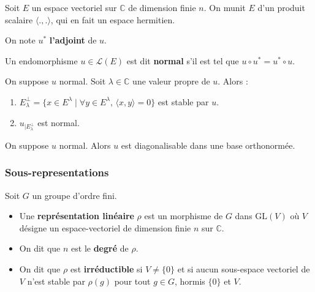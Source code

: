 	Soit $E$ un espace vectoriel sur $\mathbb{C}$ de dimension finie $n$. On munit $E$ d'un produit scalaire $\langle . , . \rangle$, qui en fait un espace hermitien.


	\begin{notation}
		On note $u^*$ \textbf{l'adjoint} de $u$.
	\end{notation}

	\begin{definition}
		Un endomorphisme $u \in \mathcal{L}(E)$ est dit \textbf{normal} s'il est tel que $u \circ u^* = u^* \circ u$.
	\end{definition}

	\begin{proposition}
		On suppose $u$ normal. Soit $\lambda \in \mathbb{C}$ une valeur propre de $u$. Alors :
		\begin{enumerate}[label=(\roman*)]
			\item $E_\lambda^\perp = \{ x \in E^\lambda \mid \forall y \in E^\lambda, \, \langle x, y \rangle = 0 \}$ est stable par $u$.
			\item $u_{| E_\lambda^\perp}$ est normal.
		\end{enumerate}
	\end{proposition}

	\begin{corollary}
		On suppose $u$ normal. Alors $u$ est diagonalisable dans une base orthonormée.
	\end{corollary}

	\subsubsection{Sous-representations}


	Soit $G$ un groupe d'ordre fini.

	\begin{definition}
		\begin{itemize}
			\item Une \textbf{représentation linéaire} $\rho$ est un morphisme de $G$ dans $\mathrm{GL}(V)$ où $V$ désigne un espace-vectoriel de dimension finie $n$ sur $\mathbb{C}$.
			\item On dit que $n$ est le \textbf{degré} de $\rho$.
			\item On dit que $\rho$ est \textbf{irréductible} si $V \neq \{ 0 \}$ et si aucun sous-espace vectoriel de $V$ n'est stable par $\rho(g)$ pour tout $g \in G$, hormis $\{ 0 \}$ et $V$.
		\end{itemize}
	\end{definition}

